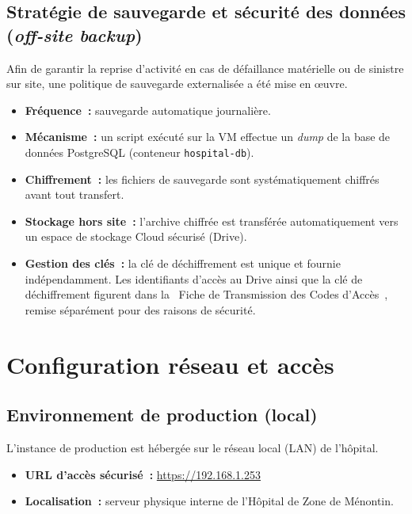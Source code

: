 \documentclass[11pt,a4paper]{article}
\begin{document}
\subsection{Stratégie de sauvegarde et sécurité des données (\emph{off-site backup})}
Afin de garantir la reprise d'activité en cas de défaillance matérielle ou de sinistre sur site, une politique de sauvegarde externalisée a été mise en œuvre.
\begin{itemize}
  \item \textbf{Fréquence~:} sauvegarde automatique journalière.
  \item \textbf{Mécanisme~:} un script exécuté sur la VM effectue un \emph{dump} de la base de données PostgreSQL (conteneur \texttt{hospital-db}).
  \item \textbf{Chiffrement~:} les fichiers de sauvegarde sont systématiquement chiffrés avant tout transfert.
  \item \textbf{Stockage hors site~:} l'archive chiffrée est transférée automatiquement vers un espace de stockage Cloud sécurisé (Drive).
  \item \textbf{Gestion des clés~:} la clé de déchiffrement est unique et fournie indépendamment. Les identifiants d'accès au Drive ainsi que la clé de déchiffrement figurent dans la \og~Fiche de Transmission des Codes d'Accès~\fg{}, remise séparément pour des raisons de sécurité.
\end{itemize}

\section{Configuration réseau et accès}

\subsection{Environnement de production (local)}
L'instance de production est hébergée sur le réseau local (LAN) de l'hôpital.
\begin{itemize}
  \item \textbf{URL d'accès sécurisé~:} \url{https://192.168.1.253}
  \item \textbf{Localisation~:} serveur physique interne de l'Hôpital de Zone de Ménontin.
\end{itemize}
\end{document}
